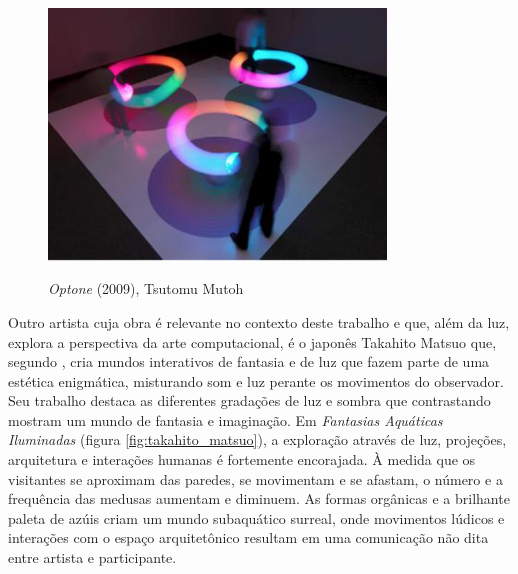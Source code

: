 \begin{figure}[H]
  \begin{center}
    \caption{\textit{Optone} (2009), Tsutomu Mutoh}
    \vspace*{0,2cm}
    \includegraphics[width=0.8\textwidth]{./04-figuras/tsutomu_mutoh}
    \label{fig:tsutomu_mutoh}
  \end{center}
  \vspace*{-0,9cm}
\end{figure}

Outro artista cuja obra é relevante no contexto deste trabalho e que, além da luz, explora a perspectiva da arte computacional, é o japonês Takahito Matsuo que, segundo , cria mundos interativos de fantasia e de luz que fazem parte de uma estética enigmática, misturando som e luz perante os movimentos do observador. Seu trabalho destaca as diferentes gradações de luz e sombra que contrastando mostram um mundo de fantasia e imaginação. Em \textit{Fantasias Aquáticas Iluminadas} (figura \ref{fig:takahito_matsuo}), a exploração através de luz, projeções, arquitetura e interações humanas é fortemente encorajada. À medida que os visitantes se aproximam das paredes, se movimentam e se afastam, o número e a frequência das medusas aumentam e diminuem. As formas orgânicas e a brilhante paleta de azúis criam um mundo subaquático surreal, onde movimentos lúdicos e interações com o espaço arquitetônico resultam em uma comunicação não dita entre artista e participante. 

